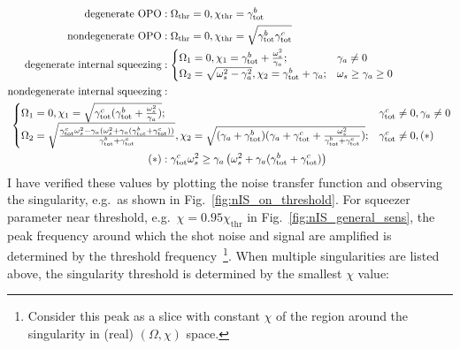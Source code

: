\begin{align}\label{eq:singularity_threshold}
\text{degenerate OPO}&: \Omega_\text{thr}=0, \chi_\text{thr}=\gamma^b_\mathrm{tot}\\
\text{nondegenerate OPO}&: \Omega_\text{thr}=0, \chi_\text{thr}=\sqrt{\gamma^b_\mathrm{tot}\gamma^c_\text{tot}}\\
\text{degenerate internal squeezing}&:\begin{cases}
\Omega_1=0, \chi_1=\gamma^b_\mathrm{tot}+\frac{\omega_s^2}{\gamma_a};&\gamma_a\neq0\\
\Omega_2=\sqrt{\omega_s^2-\gamma_a^2}, \chi_2=\gamma^b_\mathrm{tot}+\gamma_a;&\omega_s\geq\gamma_a\geq0
\end{cases}\\
\text{nondegenerate internal squeezing}&:\nonumber\\&\hspace{-5cm}\begin{cases}
\Omega_1=0, \chi_1=\sqrt{\gamma^c_\text{tot}(\gamma^b_\mathrm{tot}+\frac{\omega_s^2}{\gamma_a})};&\gamma^c_\text{tot}\neq0,\gamma_a\neq0\\
\Omega_2=\sqrt{\frac{\gamma^c_\text{tot}\omega_s^2-\gamma_a(\omega_s^2+\gamma_a(\gamma^b_\mathrm{tot}+\gamma^c_\text{tot}))}{\gamma^b_\mathrm{tot}+\gamma^c_\text{tot}}}, \chi_2=\sqrt{(\gamma_a+\gamma^b_\mathrm{tot})(\gamma_a+\gamma^c_\text{tot}+\frac{\omega_s^2}{\gamma^b_\mathrm{tot}+\gamma^c_\text{tot}})};&\gamma^c_\text{tot}\neq0,(*)
\end{cases}\nonumber\\
(*)&:\gamma^c_\text{tot}\omega_s^2\geq\gamma_a\left(\omega_s^2+\gamma_a(\gamma^b_\mathrm{tot}+\gamma^c_\text{tot})\right)
\end{align}
\endgroup
I have verified these values by plotting the noise transfer function and observing the singularity, e.g.\ as shown in Fig.~\ref{fig:nIS_on_threshold}. For squeezer parameter near threshold, e.g.\ $\chi=0.95\chi_\text{thr}$ in Fig.~\ref{fig:nIS_general_sens}, the peak frequency around which the shot noise and signal are amplified is determined by the threshold frequency~\footnote{Consider this peak as a slice with constant $\chi$ of the region around the singularity in (real) $(\Omega,\chi)$ space.}. When multiple singularities are listed above, the singularity threshold is determined by the smallest $\chi$ value:
